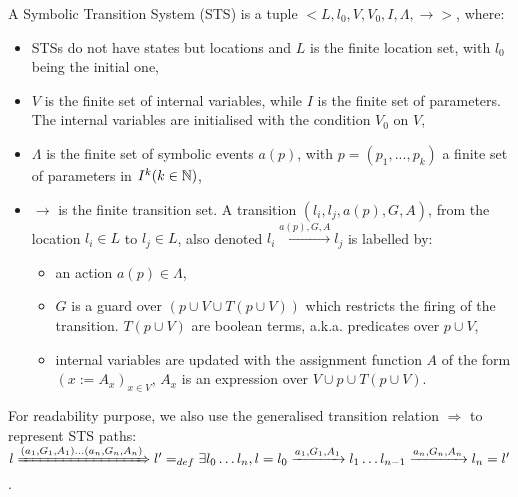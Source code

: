 \begin{definition}[STS]
    A Symbolic Transition System (STS) is a tuple
    $<L,l_0,V,V_0,I,\Lambda,\rightarrow>$, where:

	\begin{itemize}
        \item STSs do not have states but locations and $L$ is
        the finite location set, with $l_0$ being the initial
        one,

        \item $V$ is the finite set of internal variables, while
        $I$ is the finite set of parameters. The internal
        variables are initialised with the condition $V_0$ on
        $V$,

        \item $\Lambda$ is the finite set of symbolic events
        $a(p)$, with $p=(p_1,...,p_k)$ a finite set of parameters
        in $I^k (k \in \mathbb{N})$,

        \item $\rightarrow$ is the finite transition set. A
        transition $(l_i,l_j,a(p),G,A)$, from the location $l_i
        \in L$ to $l_j \in L$, also denoted $l_i
        \xrightarrow{a(p),G,A} l_j$ is labelled by:

		\begin{itemize}
            \item an action $a(p) \in \Lambda$,

            \item $G$ is a guard over $(p \cup V \cup T(p \cup
            V))$ which restricts the firing of the transition.
            $T(p \cup V)$ are boolean terms, a.k.a. predicates
            over $p \cup V$,

            \item internal variables are updated with the
            assignment function $A$ of the form $(x:=A_x)_{x \in
            V}$, $A_x$ is an expression over $V\cup p \cup
            T(p\cup V)$.
		\end{itemize}
	\end{itemize}

	\label{def:sts}
\end{definition}

For readability purpose, we also use the generalised transition
relation $\Rightarrow$ to represent STS paths:\\ $l
\xRightarrow{(a_1,G_1,A_1) \dots (a_n,G_n,A_n)} l' =_{def}
\exists l_0 \dots l_n, l=l_0 \xrightarrow{a_1,G_1,A_1} l_1 \dots
l_{n-1}\xrightarrow{a_n,G_n,A_n}l_n=l'$.

